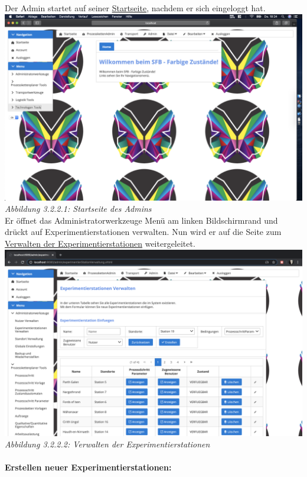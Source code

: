 \documentclass[enabledeprecatedfontcommands,fontsize=12pt,paper=a4,twoside]{scrartcl}
\begin{document}
Der Admin startet auf seiner \hyperlink{sc3.1.3.1}{Startseite}, nachdem er sich eingeloggt hat. \\

\hypertarget{sc3.1.3.1}{
\includegraphics[width=1\textwidth]{Screenshots/311AdminView.png}
\textit{Abbildung 3.2.2.1: Startseite des Admins}
} \\

Er öffnet das Administratorwerkzeuge Menü am linken Bildschirmrand und drückt auf Experimentierstationen verwalten. Nun wird er auf die Seite zum \hyperlink{sc3.1.3.2}{Verwalten der Experimentierstationen} weitergeleitet. \\

\hypertarget{sc3.1.3.2}{
\includegraphics[width=1\textwidth]{Screenshots/3132.png}
\textit{Abbildung 3.2.2.2: Verwalten der Experimentierstationen}
} \\

\paragraph{Erstellen neuer Experimentierstationen:}
\end{document}
